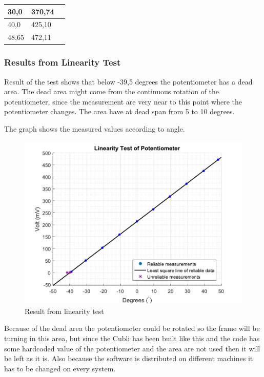 \begin{table}[H]
\begin{tabular}{|l|l|p{4.3cm}|}
		30,0                              			  & 370,74               \\
		\hline%
		40,0                                          & 425,10               \\
		\hline%
		48,65 										  & 472,11               \\
		\hline%
	\end{tabular}
\end{table}


\subsubsection{Results from Linearity Test}
Result of the test shows that below -39,5 degrees the potentiometer has a dead area. The dead area might come from the continuous rotation of the potentiometer, since the measurement are very near to this point where the potentiometer changes. The area have at dead span from 5 to 10 degrees.

The graph shows the measured values according to angle.

\begin{figure}[H] 
	\centering 
	\includegraphics[scale=0.7]{figures/linearityOfPotmeterTest2-1}
	\caption{Result from linearity test}
	\label{linearityOfPotmeterTest2-1}
\end{figure}
Because of the dead area the potentiometer could be rotated so the frame will be turning in this area, but since the Cubli has been built like this and the code has some hardcoded value of the potentiometer and the area are not used then it will be left as it is. Also because the software is distributed on different machines it has to be changed on every system.


